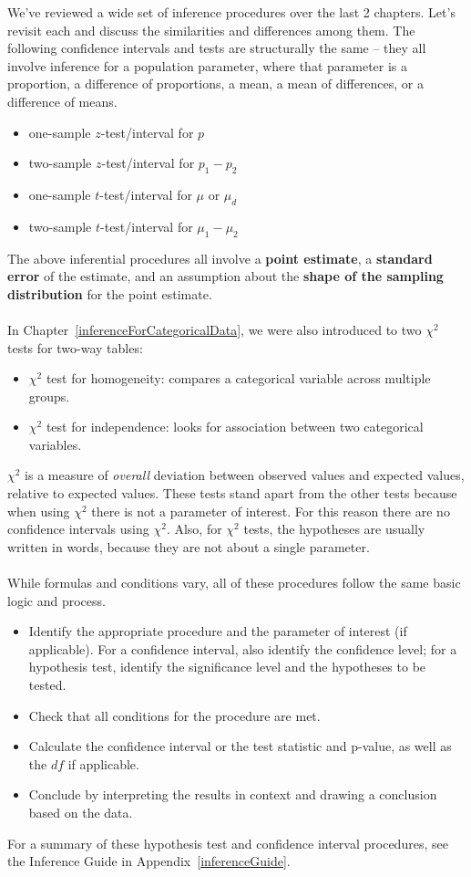 \noindent We've reviewed a wide set of inference procedures over the last 2 chapters. Let's revisit each and discuss the similarities and differences among them.  The following confidence intervals and tests are structurally the same -- they all involve inference for a population parameter, where that parameter is a proportion, a difference of proportions, a mean, a mean of differences, or a difference of means. \vspace{-1mm}
\begin{itemize}
\setlength{\itemsep}{0mm}
\item one-sample $z$-test/interval for $p$
\item two-sample $z$-test/interval for $p_1 - p_2$
\item one-sample $t$-test/interval for $\mu$ or $\mu_d$
\item two-sample $t$-test/interval for $\mu_1 - \mu_2$
\end{itemize}
The above inferential procedures all involve a \textbf{point estimate}, a \textbf{standard error} of the estimate, and an assumption about the \textbf{shape of the sampling distribution} for the point estimate.
\\ 
\\ 
In Chapter~\ref{inferenceForCategoricalData}, we were also introduced to two $\chi^2$ tests for two-way tables:\vspace{-1mm}
\begin{itemize}
\setlength{\itemsep}{0mm}
\item $\chi^2$ test for homogeneity:  compares a categorical variable across multiple groups.
\item $\chi^2$ test for independence:  looks for association between two categorical variables. 
\end{itemize}
$\chi^2$ is a measure of \emph{overall} deviation between observed values and expected values, relative to expected values.  These tests stand apart from the other tests because when using $\chi^2$ there is not a parameter of interest.  For this reason there are no confidence intervals using $\chi^2$.  Also, for $\chi^2$ tests, the hypotheses are usually written in words, because they are not about a single parameter.  
\\
\\
While formulas and conditions vary, all of these procedures follow the same basic logic and process.
\begin{itemize}\vspace{-1mm}
\setlength{\itemsep}{0mm}
\item Identify the appropriate procedure and the parameter of interest (if applicable).  For a confidence interval, also identify the confidence level; for a hypothesis test, identify the significance level and the hypotheses to be tested.
\item Check that all conditions for the procedure are met.
\item Calculate the confidence interval or the test statistic and p-value, as well as the $df$ if applicable.
\item Conclude by interpreting the results in context and drawing a conclusion based on the data.
\end{itemize}
For a summary of these hypothesis test and confidence interval procedures, see the Inference Guide in Appendix~\ref{inferenceGuide}.
